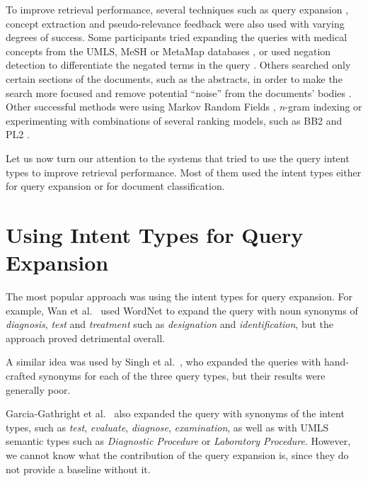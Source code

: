 To improve retrieval performance, several techniques such as
query expansion \cite{mutrec, sankhavara2014fusing, cuhk, CSEIITV, ucla, udel, duth, ir.cs.sfsu, goodwin2014utd, oh2014kisti},
concept extraction \cite{ir.cs.sfsu, ucla, bitem, goodwin2014utd, oh2014kisti}
and pseudo-relevance feedback \cite{novasearch, waterloo, mutrec, oh2014kisti, choi, dinh2014crp}
were also used with varying degrees of success.
Some participants tried expanding the queries with medical concepts
from the UMLS, MeSH or MetaMap databases \cite{lamda2015, ucla, udel, bitem, novasearch},
or used negation detection to differentiate the negated terms in the query
\cite{wing2014query, wei2014atigeo, ucla, oh2014kisti}.
Others searched only certain sections of the documents, such as the abstracts, in order to make the search more focused
and remove potential ``noise'' from the documents' bodies \cite{ucla}.
Other successful methods were using Markov Random Fields \cite{wsuir},
\emph{n}-gram indexing \cite{xu2014hltcoe}
or experimenting with combinations of several ranking models,
such as BB2 and PL2 \cite{song2015ecnu}.

Let us now turn our attention to the systems that tried to use the query intent types to improve retrieval performance.
Most of them used the intent types either for query expansion or for document classification.

\section{Using Intent Types for Query Expansion}

The most popular approach was using the intent types for query expansion.
For example, Wan et al.\ \cite{cuhk} used WordNet to expand the query with noun synonyms
of \emph{diagnosis}, \emph{test} and \emph{treatment} such as \emph{designation} and \emph{identification},
but the approach proved detrimental overall.

A similar idea was used by Singh et al.\ \cite{CSEIITV}, who expanded the queries with hand-crafted synonyms
for each of the three query types, but their results were generally poor.

Garcia-Gathright et al.\ \cite{ucla} also expanded the query with synonyms of the intent types, such as \emph{test}, \emph{evaluate},
\emph{diagnose}, \emph{examination}, as well as with UMLS semantic types such as \emph{Diagnostic Procedure}
or \emph{Laboratory Procedure}. However, we cannot know what the contribution
of the query expansion is, since they do not provide a baseline without it.

